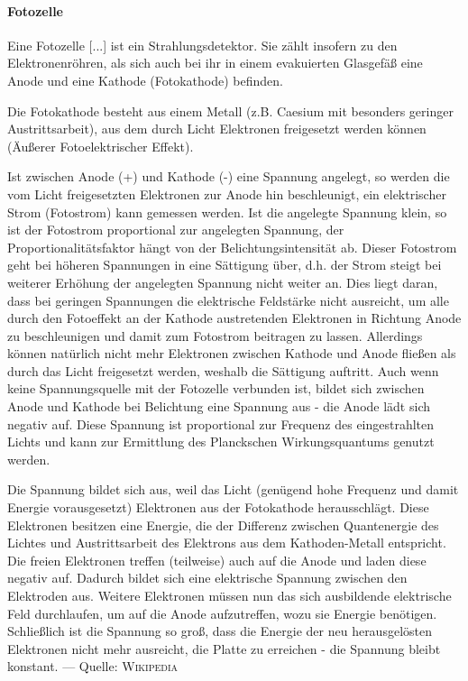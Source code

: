 \paragraph{Fotozelle}

Eine Fotozelle [...] ist ein Strahlungsdetektor. Sie zählt insofern zu den Elektronenröhren, als sich auch bei ihr in einem evakuierten Glasgefäß eine Anode und eine Kathode (Fotokathode) befinden.

Die Fotokathode besteht aus einem Metall (z.B. Caesium mit besonders geringer Austrittsarbeit), aus dem durch Licht Elektronen freigesetzt werden können (Äußerer Fotoelektrischer Effekt).
 

Ist zwischen Anode (+) und Kathode (-) eine Spannung angelegt, so werden die vom Licht freigesetzten Elektronen zur Anode hin beschleunigt, ein elektrischer Strom (Fotostrom) kann gemessen werden. Ist die angelegte Spannung klein, so ist der Fotostrom proportional zur angelegten Spannung, der Proportionalitätsfaktor hängt von der Belichtungsintensität ab. Dieser Fotostrom geht bei höheren Spannungen in eine Sättigung über, d.h. der Strom steigt bei weiterer Erhöhung der angelegten Spannung nicht weiter an. Dies liegt daran, dass bei geringen Spannungen die elektrische Feldstärke nicht ausreicht, um alle durch den Fotoeffekt an der Kathode austretenden Elektronen in Richtung Anode zu beschleunigen und damit zum Fotostrom beitragen zu lassen. Allerdings können natürlich nicht mehr Elektronen zwischen Kathode und Anode fließen als durch das Licht freigesetzt werden, weshalb die Sättigung auftritt. Auch wenn keine Spannungsquelle mit der Fotozelle verbunden ist, bildet sich zwischen Anode und Kathode bei Belichtung eine Spannung aus - die Anode lädt sich negativ auf. Diese Spannung ist proportional zur Frequenz des eingestrahlten Lichts und kann zur Ermittlung des Planckschen Wirkungsquantums genutzt werden.

Die Spannung bildet sich aus, weil das Licht (genügend hohe Frequenz und damit Energie vorausgesetzt) Elektronen aus der Fotokathode herausschlägt. Diese Elektronen besitzen eine Energie, die der Differenz zwischen Quantenergie des Lichtes und Austrittsarbeit des Elektrons aus dem Kathoden-Metall entspricht. Die freien Elektronen treffen (teilweise) auch auf die Anode und laden diese negativ auf. Dadurch bildet sich eine elektrische Spannung zwischen den Elektroden aus. Weitere Elektronen müssen nun das sich ausbildende elektrische Feld durchlaufen, um auf die Anode aufzutreffen, wozu sie Energie benötigen. Schließlich ist die Spannung so groß, dass die Energie der neu herausgelösten Elektronen nicht mehr ausreicht, die Platte zu erreichen - die Spannung bleibt konstant.  --- Quelle: \textsc{Wikipedia}
















% 
% 
% 

